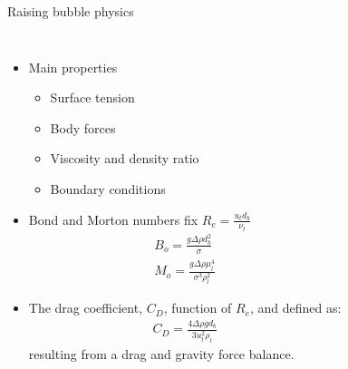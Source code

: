 \documentclass[8pt]{beamer}
\begin{document}
	
	
	\begin{frame}{Raising bubble physics}
		
		\begin{columns}[T]
		
			
			\begin{itemize}
				\item Main properties
				\begin{itemize}
					\item Surface tension
					\item Body forces
					\item Viscosity and density ratio
					\item Boundary conditions
				\end{itemize}
			
				\item Bond and Morton numbers fix $R_e = \frac{u_t d_b}{\nu_l}$
				\begin{equation*}
				\begin{split}
				B_o = \frac{g \Delta \rho d_b^2}{\sigma}\\
				M_o = \frac{g \Delta \rho \mu_l^4}{\sigma^3 
					\rho_l^2}
				\end{split}
				\end{equation*}
				
				\item The drag coefficient, $C_D$, function of $R_e$, and defined as: 
				\begin{equation*}
				\begin{split}
				C_D = \frac{4 \Delta \rho g d_b}{3 u_t^2 \rho_l}
				\end{split}
				\end{equation*}
				resulting from a drag and gravity force balance. 
				\end{itemize}
		

\end{columns}
\end{frame}
\end{document}

